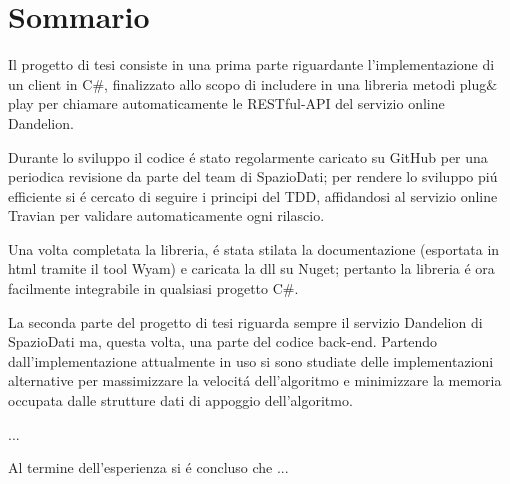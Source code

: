 \chapter*{Sommario} %
\label{sommario}


Il progetto di tesi consiste in una prima parte riguardante l'implementazione di un client in C$\#$, finalizzato allo scopo di includere 
in una libreria metodi plug$\&$play per chiamare automaticamente le RESTful-API del servizio online Dandelion. 

Durante lo sviluppo il codice \'e stato regolarmente caricato su GitHub per una periodica revisione da parte del team di SpazioDati; 
per rendere lo sviluppo pi\'u efficiente si \'e cercato di seguire i principi del TDD, affidandosi al servizio online Travian 
per validare automaticamente ogni rilascio. 

Una volta completata la libreria, \'e stata stilata la documentazione (esportata in html tramite il tool Wyam) e caricata la dll su Nuget; 
pertanto la libreria \'e ora facilmente integrabile in qualsiasi progetto C$\#$.

La seconda parte del progetto di tesi riguarda sempre il servizio Dandelion di SpazioDati ma, questa volta, una parte del codice back-end.
Partendo dall'implementazione attualmente in uso si sono studiate delle implementazioni alternative per massimizzare la velocit\'a dell'algoritmo e minimizzare 
la memoria occupata dalle strutture dati di appoggio dell'algoritmo. 

...

Al termine dell'esperienza si \'e concluso che ...




